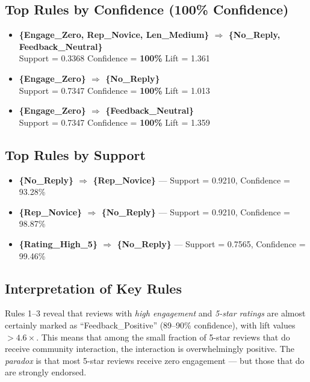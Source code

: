 \documentclass[12pt,a4paper]{article}
\begin{document}
\subsection{Top Rules by Confidence (100\% Confidence)}

\begin{rulebox}[Deterministic Rules (Confidence = 100\%)]
\begin{itemize}
    \item \textbf{\{Engage\_Zero, Rep\_Novice, Len\_Medium\} $\Rightarrow$ \{No\_Reply, Feedback\_Neutral\}}\\
    Support = 0.3368 \quad Confidence = \textbf{100\%} \quad Lift = 1.361

    \item \textbf{\{Engage\_Zero\} $\Rightarrow$ \{No\_Reply\}}\\
    Support = 0.7347 \quad Confidence = \textbf{100\%} \quad Lift = 1.013

    \item \textbf{\{Engage\_Zero\} $\Rightarrow$ \{Feedback\_Neutral\}}\\
    Support = 0.7347 \quad Confidence = \textbf{100\%} \quad Lift = 1.359
\end{itemize}
\end{rulebox}

\subsection{Top Rules by Support}

\begin{rulebox}
\begin{itemize}
    \item \textbf{\{No\_Reply\} $\Rightarrow$ \{Rep\_Novice\}} --- Support = 0.9210, Confidence = 93.28\%
    \item \textbf{\{Rep\_Novice\} $\Rightarrow$ \{No\_Reply\}} --- Support = 0.9210, Confidence = 98.87\%
    \item \textbf{\{Rating\_High\_5\} $\Rightarrow$ \{No\_Reply\}} --- Support = 0.7565, Confidence = 99.46\%
\end{itemize}
\end{rulebox}

\subsection{Interpretation of Key Rules}

\begin{findingbox}
Rules 1--3 reveal that reviews with \emph{high engagement} and \emph{5-star ratings} are almost certainly marked as ``Feedback\_Positive'' (89--90\% confidence), with lift values $> 4.6\times$. This means that among the small fraction of 5-star reviews that do receive community interaction, the interaction is overwhelmingly positive. The \textit{paradox} is that most 5-star reviews receive zero engagement --- but those that do are strongly endorsed.
\end{findingbox}
\end{document}
